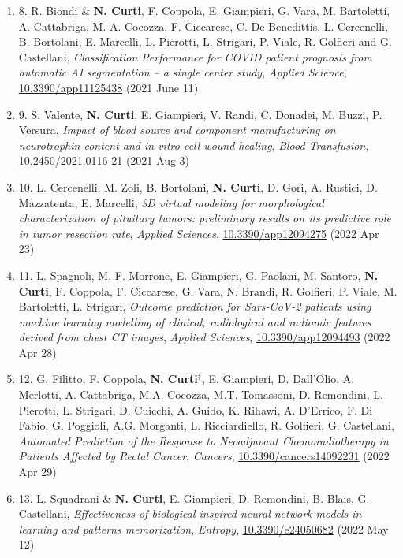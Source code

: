 \documentclass[a4paper,11pt]{article}
\newcommand{\enumicon}[2]{\item[{\texttt{[image: \#2]}}]}
\begin{document}
\begin{enumerate}
  \enumicon{0.05}{article.png}8. R. Biondi \& \textbf{N. Curti}, F. Coppola, E. Giampieri, G. Vara, M. Bartoletti, A. Cattabriga, M. A. Cocozza, F. Ciccarese, C. De Benedittis, L. Cercenelli, B. Bortolani, E. Marcelli, L. Pierotti, L. Strigari, P. Viale, R. Golfieri and G. Castellani, \emph{Classification Performance for COVID patient prognosis from automatic AI segmentation – a single center study}, \emph{Applied Science}, \url{10.3390/app11125438} (2021 June 11)

  \enumicon{0.05}{article.png}9. S. Valente, \textbf{N. Curti}, E. Giampieri, V. Randi, C. Donadei, M. Buzzi, P. Versura, \emph{Impact of blood source and component manufacturing on neurotrophin content and in vitro cell wound healing}, \emph{Blood Transfusion}, \url{10.2450/2021.0116-21} (2021 Aug 3)

  \enumicon{0.05}{article.png}10. L. Cercenelli, M. Zoli, B. Bortolani, \textbf{N. Curti}, D. Gori, A. Rustici, D. Mazzatenta, E. Marcelli, \emph{3D virtual modeling for morphological characterization of pituitary tumors: preliminary results on its predictive role in tumor resection rate}, \emph{Applied Sciences}, \url{10.3390/app12094275} (2022 Apr 23)

  \enumicon{0.05}{article.png}11. L. Spagnoli, M. F. Morrone, E. Giampieri, G. Paolani, M. Santoro, \textbf{N. Curti}, F. Coppola, F. Ciccarese, G. Vara, N. Brandi, R. Golfieri, P. Viale, M. Bartoletti, L. Strigari, \emph{Outcome prediction for Sars-CoV-2 patients using machine learning modelling of clinical, radiological and radiomic features derived from chest CT images}, \emph{Applied Sciences}, \url{10.3390/app12094493} (2022 Apr 28)

  \enumicon{0.05}{article.png}12. G. Filitto, F. Coppola, \textbf{N. Curti$^\dagger$}, E. Giampieri, D. Dall’Olio, A. Merlotti, A. Cattabriga, M.A. Cocozza, M.T. Tomassoni, D. Remondini, L. Pierotti, L. Strigari, D. Cuicchi, A. Guido, K. Rihawi, A. D'Errico, F. Di Fabio, G. Poggioli, A.G. Morganti, L. Ricciardiello, R. Golfieri, G. Castellani, \emph{Automated Prediction of the Response to Neoadjuvant Chemoradiotherapy in Patients Affected by Rectal Cancer}, \emph{Cancers}, \url{10.3390/cancers14092231} (2022 Apr 29)

  \enumicon{0.05}{article.png}13. L. Squadrani \& \textbf{N. Curti}, E. Giampieri, D. Remondini, B. Blais, G. Castellani, \emph{Effectiveness of biological inspired neural network models in learning and patterns memorization}, \emph{Entropy}, \url{10.3390/e24050682} (2022 May 12)


\end{enumerate}
\end{document}
